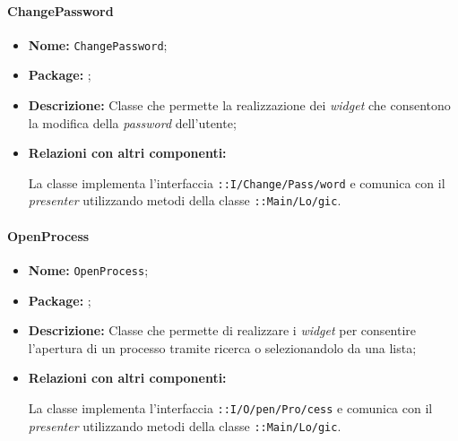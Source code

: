 \paragraph{ChangePassword}
\begin{flushleft}
\begin{itemize}
\item \textbf{Nome:} \texttt{ChangePassword};
\item \textbf{Package:} \texttt{\viewUser{}};
\item \textbf{Descrizione:} Classe che permette la realizzazione dei \textit{widget} che consentono la modifica della \textit{password} dell'utente;
\item \textbf{Relazioni con altri componenti:}
\begin{sloppypar}
La classe implementa l'interfaccia \texttt{\iViewUser{}::I\fshyp{}Change\fshyp{}Pass\fshyp{}word} e comunica con il \textit{presenter} utilizzando metodi della classe \texttt{\logicUser{}::Main\fshyp{}Lo\fshyp{}gic}.
\end{sloppypar}
\end{itemize}
\end{flushleft}

\paragraph{OpenProcess}
\begin{flushleft}
\begin{itemize}
\item \textbf{Nome:} \texttt{OpenProcess};
\item \textbf{Package:} \texttt{\viewUser{}};
\item \textbf{Descrizione:} Classe che permette di realizzare i \textit{widget} per consentire l'apertura di un processo tramite ricerca o selezionandolo da una lista;
\item \textbf{Relazioni con altri componenti:}
\begin{sloppypar}
La classe implementa l'interfaccia \texttt{\iViewUser{}::I\fshyp{}O\fshyp{}pen\fshyp{}Pro\fshyp{}cess} e comunica con il \textit{presenter} utilizzando metodi della classe \texttt{\logicUser{}::Main\fshyp{}Lo\fshyp{}gic}.
\end{sloppypar}
\end{itemize}
\end{flushleft}

